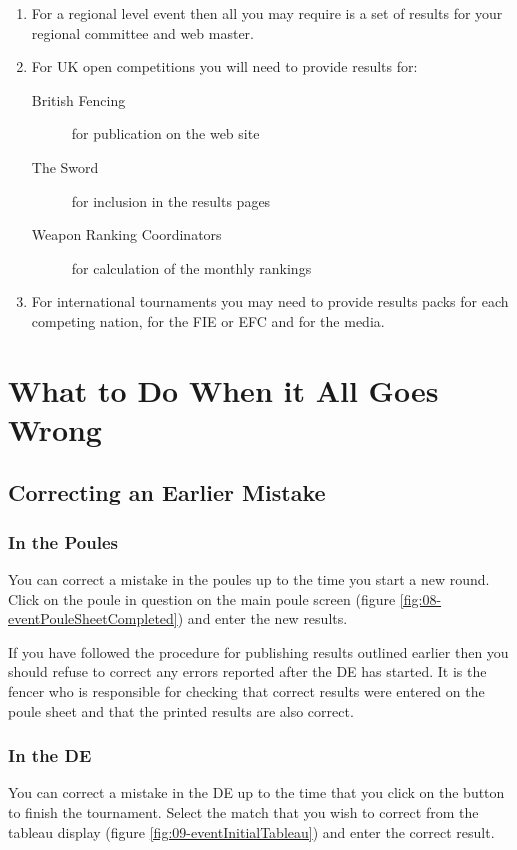 \documentclass[a4paper,11pt]{memoir}
\begin{document}
\begin{enumerate}
 \item For a regional level \gls{event} then all you may require is a set of results for your regional committee and web master.
 \item For UK open competitions you will need to provide results for:
 \begin{description}
  \item[British Fencing] for publication on the web site
  \item[The Sword] for inclusion in the results pages
  \item[Weapon Ranking Coordinators] for calculation of the monthly rankings
 \end{description}
 \item For international tournaments you may need to provide results packs for each competing nation, for the FIE or EFC and for the media.
\end{enumerate}

\chapter{What to Do When it All Goes Wrong}

\section{Correcting an Earlier Mistake}

\subsection{In the Poules}

You can correct a mistake in the poules up to the time you start a new round. Click on the poule in question on the main poule screen (figure \ref{fig:08-eventPouleSheetCompleted}) and enter the new results. 

If you have followed the procedure for publishing results outlined earlier then you should refuse to correct any errors reported after the DE has started. It is the fencer who is responsible for checking that correct results were entered on the poule sheet and that the printed results are also correct.

\subsection{In the DE}

You can correct a mistake in the DE up to the time that you click on the  button to finish the tournament. Select the match that you wish to correct from the tableau display (figure \ref{fig:09-eventInitialTableau}) and enter the correct result.
\end{document}
